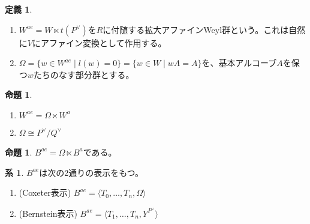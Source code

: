 \documentclass[uplatex, a4paper, dvipdfmx]{jsarticle}
\theoremstyle{definition}
\newtheorem{definition}[theorem]{定義}
\newtheorem{proposition}[theorem]{命題}
\newtheorem{corollary}[theorem]{系}
\begin{document}
\begin{definition}
    \begin{enumerate}
        \item  $W^{ae} = W \ltimes t(P^\vee)$を$R$に付随する拡大アファインWeyl群という。これは自然に$V$にアファイン変換として作用する。
        \item $\Omega = \{w \in W^{ae} \mid l(w) = 0\} = \{w \in W \mid wA = A\}$を、基本アルコーブ$A$を保つ$w$たちのなす部分群とする。
    \end{enumerate}
\end{definition}
\begin{proposition}
    \begin{enumerate}
        \item $W^{ae} = \Omega \ltimes W^a$
        \item $\Omega \cong P^\vee/Q^\vee$
    \end{enumerate}
\end{proposition}
\begin{proposition}
    $B^{ae} = \Omega \ltimes B^a$である。
\end{proposition}
\begin{corollary}
    $B^{ae}$は次の2通りの表示をもつ。
    \begin{enumerate}
        \item (Coxeter表示) $B^{ae} = \langle T_0, \dots, T_n, \Omega\rangle$
        \item (Bernstein表示) $B^{ae} = \langle T_1, \dots, T_n, Y^{P^\vee}\rangle$
    \end{enumerate}
\end{corollary}
\end{document}
